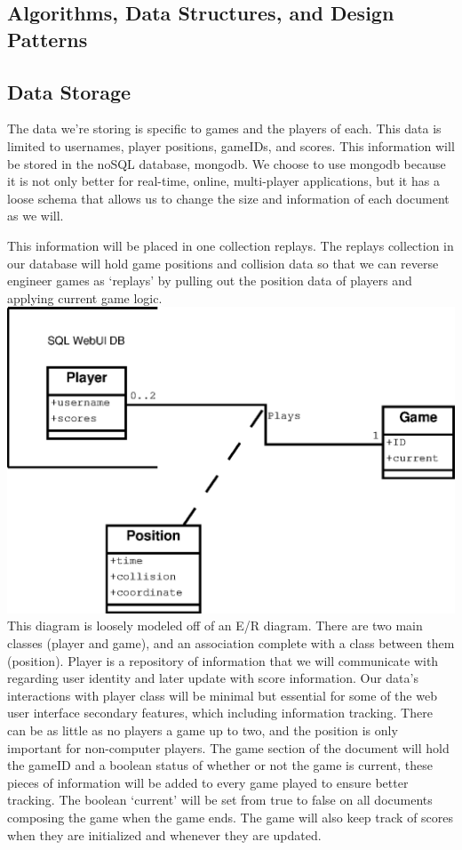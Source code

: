 \documentclass[letterpaper,12pt]{article}
\begin{document}
\subsection{Algorithms, Data Structures, and Design Patterns}
\subsection{Data Storage}
The data we’re storing is specific to games and the players of each. This data is limited to usernames, player positions, gameIDs, and scores. This information will be stored in the noSQL database, mongodb. We choose to use mongodb because it is not only better for real-time, online, multi-player applications, but it has a loose schema that allows us to change the size and information of each document as we will.

This information will be placed in one collection replays. The replays collection in our database will hold game positions and collision data so that we can reverse engineer games as ‘replays’ by pulling out the position data of players and applying current game logic. \\

\includegraphics{ERdia.eps} \\


This diagram is loosely modeled off of an E/R diagram. There are two main classes (player and game), and an association complete with a class between them (position). Player is a repository of information that we will communicate with regarding user identity and later update with score information. Our data’s interactions with player class will be minimal but essential for some of the web user interface secondary features, which including information tracking. There can be as little as no players a game up to two, and the position is only important for non-computer players. The game section of the document will hold the gameID and a boolean status of whether or not the game is current, these pieces of information will be added to every game played to ensure better tracking. The boolean ‘current’ will be set from true to false on all documents composing the game when the game ends. The game will also keep track of scores when they are initialized and whenever they are updated.
\end{document}

